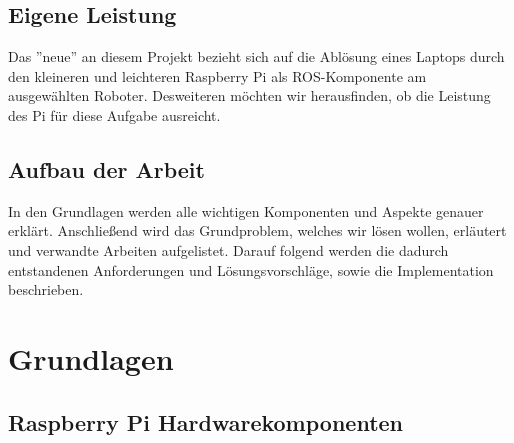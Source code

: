 \documentclass[12pt]{article}
\begin{document}
\subsection{Eigene Leistung}

Das ''neue'' an diesem Projekt bezieht sich
auf die Ablösung eines Laptops durch den kleineren und leichteren Raspberry Pi als ROS-Komponente am ausgewählten Roboter. Desweiteren möchten wir herausfinden, ob die Leistung des Pi für diese Aufgabe ausreicht.

\subsection{Aufbau der Arbeit}

In den Grundlagen werden alle wichtigen Komponenten und Aspekte genauer erklärt. Anschließend wird das Grundproblem, welches wir lösen wollen, erläutert und verwandte Arbeiten aufgelistet. 
Darauf folgend werden die dadurch entstandenen Anforderungen und Lösungsvorschläge, sowie die Implementation beschrieben.

\section{Grundlagen}


\subsection{Raspberry Pi Hardwarekomponenten}
\end{document}
